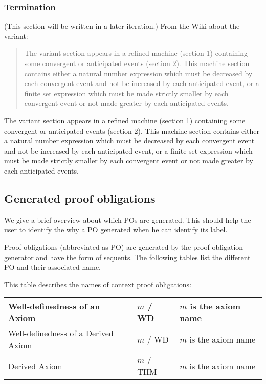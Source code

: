 \subsubsection{Termination}
\label{termination}
(This section will be written in a later iteration.)
From the Wiki about the variant:
\begin{quote}
  The variant section appears in a refined machine (section 1) containing some convergent or anticipated events (section 2).
  This machine section contains either a natural number expression which must be decreased by each convergent event and not be
  increased by each anticipated event, or a finite set expression which must be made strictly smaller by each convergent event 
  or not made greater by each anticipated events. 
\end{quote}

The variant section appears in a refined machine (section 1) containing some convergent or anticipated events (section 2). This machine section contains either a natural number expression which must be decreased by each convergent event and not be increased by each anticipated event, or a finite set expression which must be made strictly smaller by each convergent event or not made greater by each anticipated events. 

\subsection{Generated proof obligations}
\label{generated_proof_obligations}

We give a brief overview about which POs are generated. This should help the user to identify the why a PO generated when he can identify its label.

Proof obligations (abbreviated as PO) are generated by the proof obligation generator and have the form of sequents. The following tables list the different PO and their associated name.

This table describes the names of context proof obligations: 

\begin{center}
    \begin{tabular}{| p{6cm} | p{3cm} | p{5cm} |}
    \hline
	Well-definedness of an Axiom & $m$ / WD & $m$ is the axiom name\\ \hline
	Well-definedness of a Derived Axiom & $m$  / WD & $m$ is the axiom name \\ \hline
	Derived Axiom & $m$  / THM & $m$ is the axiom name \\ \hline
    \end{tabular}
\end{center}

